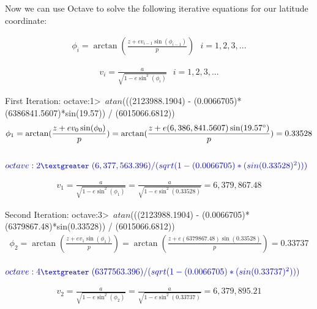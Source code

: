 \documentclass{article}
\begin{document}
\noindent Now we can use Octave to solve the following iterative equations for our latitude coordinate:

\begin{align*}
    \phi_i = \arctan(\frac{z + e v_{i-1}\sin(\phi_{i-1})}{p}) \ \ \ i = 1, 2, 3,...
\end{align*}

\begin{align*}
    v_i = \frac{a}{\sqrt{1 - e\sin^{2}(\phi_i)}} \ \ \ i = 1, 2, 3,...
\end{align*}

\vspace{5mm}
First Iteration: \newline \break  
\textnormal{\color{blue} \small octave:1\textgreater \ $atan$(((2123988.1904) - (0.0066705)*(6386841.5607)*sin(19.57)) / (6015066.6812)) \normalsize}
\begin{align*}
    \phi_1 = \arctan(\frac{z + e v_{0}\sin(\phi_{0})}{p}) = \arctan(\frac{z + e (6,386,841.5607)\sin(19.57\degree)}{p}) = 0.33528
\end{align*} \\ 
\textnormal{$\color{blue} \small octave:2\textgreater \ (6,377,563.396) / (sqrt(1 - (0.0066705)*(sin(0.33528)^2)))$ \normalsize}

\begin{align*}
    v_1 = \frac{a}{\sqrt{1 - e\sin^{2}(\phi_1)}} = \frac{a}{\sqrt{1 - e\sin^{2}(0.33528 )}} = 6,379,867.48
\end{align*}

\vspace{5mm}
Second Iteration: \newline \break  
\textnormal{\color{blue} \small octave:3\textgreater \ $atan$(((2123988.1904) - (0.0066705)*(6379867.48)*sin(0.33528)) / (6015066.6812)) \normalsize}
\begin{align*}
    \phi_2 = \arctan(\frac{z + e v_{1}\sin(\phi_{1})}{p}) = \arctan(\frac{z + e(6379867.48)\sin(0.33528)}{p}) =  0.33737
\end{align*} \\
\textnormal{$\color{blue} \small octave:4\textgreater \ (6377563.396) / (sqrt(1 - (0.0066705)*(sin(0.33737)^2)))$ \normalsize}

\begin{align*}
    v_2 = \frac{a}{\sqrt{1 - e\sin^{2}(\phi_2)}} = \frac{a}{\sqrt{1 - e\sin^{2}(0.33737)}} = 6,379,895.21
\end{align*}
\end{document}
